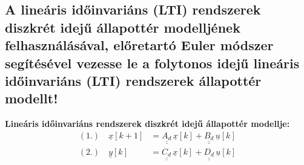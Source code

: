 \subsection{A lineáris időinvariáns (LTI) rendszerek diszkrét idejű állapottér modelljének felhasználásával, előretartó Euler módszer segítésével vezesse le a folytonos idejű lineáris időinvariáns (LTI) rendszerek állapottér modellt!}

\noindent \textbf{Lineáris időinvariáns rendszerek diszkrét idejű állapottér modellje:}
\begin{align*}
    (1.) \quad \underline{x}[k+1] &= \underline{\underline{A_d}} \, \underline{x}[k] + \underline{\underline{B_d}} \, \underline{u}[k] \\
    (2.) \quad \underline{y}[k] &= \underline{\underline{C_d}} \, \underline{x}[k] + \underline{\underline{D_d}} \, \underline{u}[k]
\end{align*}

